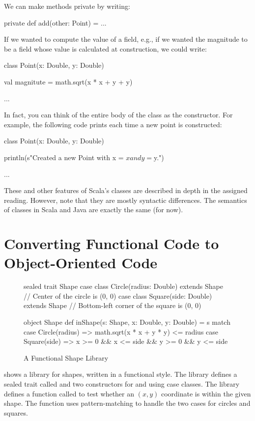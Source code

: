 \documentclass[9pt]{extbook}
\begin{document}
We can make methods private by writing:
\begin{scalacode}
private def add(other: Point) = { ... }
\end{scalacode}

If we wanted to compute the value of a field, e.g., if we wanted the magnitude
to be a field whose value is calculated at construction, we could write:
%
\begin{scalacode}
class Point(x: Double, y: Double) {

  val magnitute = math.sqrt(x * x + y + y)

  ...
}
\end{scalacode}

In fact, you can think of the entire body of the class as the constructor.
For example, the following code prints each time a new point is constructed:

%
\begin{scalacode}
class Point(x: Double, y: Double) {

  println(s"Created a new Point with x = $x and y = $y.")

  ...
}
\end{scalacode}

These and other features of Scala's classes are described in depth in the
assigned reading. However, note that they are mostly syntactic differences.
The semantics of classes in Scala and Java are exactly the same (for now).

\section{Converting Functional Code to Object-Oriented Code}

\begin{figure}
\begin{scalacode}
sealed trait Shape
case class Circle(radius: Double) extends Shape // Center of the circle is (0, 0)
case class Square(side: Double) extends Shape // Bottom-left corner of the square is (0, 0)

object Shape {
  def inShape(s: Shape, x: Double, y: Double) = s match {
    case Circle(radius) => math.sqrt(x * x + y * y) <= radius
    case Square(side) => x >= 0 && x <= side && y >= 0 && y <= side
  }
}
\end{scalacode}
\caption{A Functional Shape Library}
\label{fshapes1}
\end{figure}

 shows a library for shapes, written in a functional style.
The library defines a sealed trait called  and two
constructors for  and  using
case classes. The library defines a function called 
to test whether an $(x,y)$ coordinate is within the given shape. The function
uses pattern-matching to handle the two cases for circles and squares.
\end{document}
